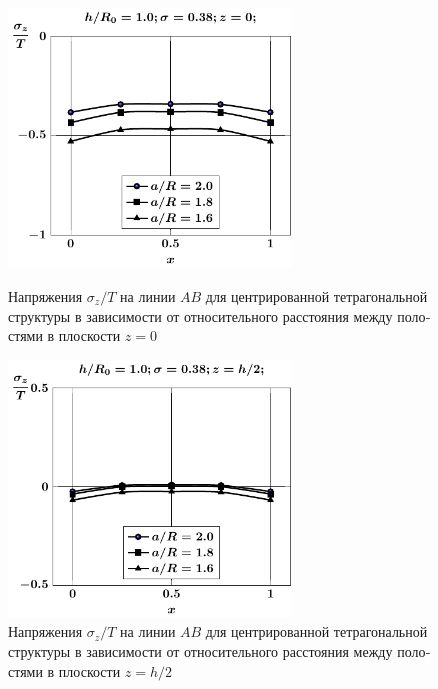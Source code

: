 \begin{russian}
\begin{figure}[h!]
\centering\footnotesize
\parbox[b]{7.5cm}{\centering\includegraphics[width=7.5cm]{cav5-a-h10-r10-z0-sig_z.pdf}
\caption{Напряжения $\sigma_z/T$ на линии $AB$ для центрированной тетрагональной структуры в зависимости от относительного расстояния между полостями в плоскости $z=0$ 
\label{f:7:99}}}\hfil\hfil
\parbox[b]{7.5cm}{\centering\includegraphics[width=7.5cm]{cav5-a-h10-r10-z1-sig_z.pdf}
\caption{Напряжения $\sigma_z/T$ на линии $AB$ для центрированной тетрагональной структуры в зависимости от относительного расстояния между полостями в плоскости $z=h/2$
\label{f:7:100}}}
\end{figure}


\end{russian}
